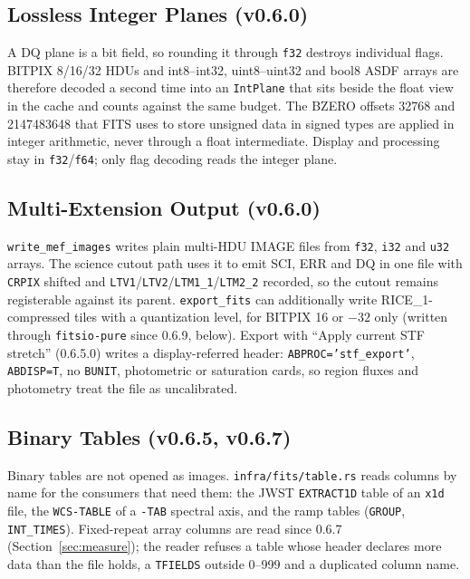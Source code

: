 \documentclass[11pt,a4paper]{article}
\newcommand{\code}[1]{\texttt{\small #1}}
\newcommand{\crate}[1]{\texttt{#1}}
\begin{document}
    \subsection{Lossless Integer Planes (v0.6.0)}

    A DQ plane is a bit field, so rounding it through \code{f32} destroys individual flags. BITPIX 8/16/32 HDUs and int8--int32, uint8--uint32 and bool8 ASDF arrays are therefore decoded a second time into an \code{IntPlane} that sits beside the float view in the cache and counts against the same budget. The BZERO offsets 32768 and 2147483648 that FITS uses to store unsigned data in signed types are applied in integer arithmetic, never through a float intermediate. Display and processing stay in \code{f32}/\code{f64}; only flag decoding reads the integer plane.

    \subsection{Multi-Extension Output (v0.6.0)}

    \code{write\_mef\_images} writes plain multi-HDU IMAGE files from \code{f32}, \code{i32} and \code{u32} arrays. The science cutout path uses it to emit SCI, ERR and DQ in one file with \code{CRPIX} shifted and \code{LTV1}/\code{LTV2}/\code{LTM1\_1}/\code{LTM2\_2} recorded, so the cutout remains registerable against its parent. \code{export\_fits} can additionally write RICE\_1-compressed tiles with a quantization level, for BITPIX 16 or $-32$ only (written through \crate{fitsio-pure} since 0.6.9, below). Export with ``Apply current STF stretch'' (0.6.5.0) writes a display-referred header: \code{ABPROC='stf\_export'}, \code{ABDISP=T}, no \code{BUNIT}, photometric or saturation cards, so region fluxes and photometry treat the file as uncalibrated.

    \subsection{Binary Tables (v0.6.5, v0.6.7)}

    Binary tables are not opened as images. \code{infra/fits/table.rs} reads columns by name for the consumers that need them: the JWST \code{EXTRACT1D} table of an \code{x1d} file, the \code{WCS-TABLE} of a \code{-TAB} spectral axis, and the ramp tables (\code{GROUP}, \code{INT\_TIMES}). Fixed-repeat array columns are read since 0.6.7 (Section~\ref{sec:measure}); the reader refuses a table whose header declares more data than the file holds, a \code{TFIELDS} outside 0--999 and a duplicated column name.
\end{document}

